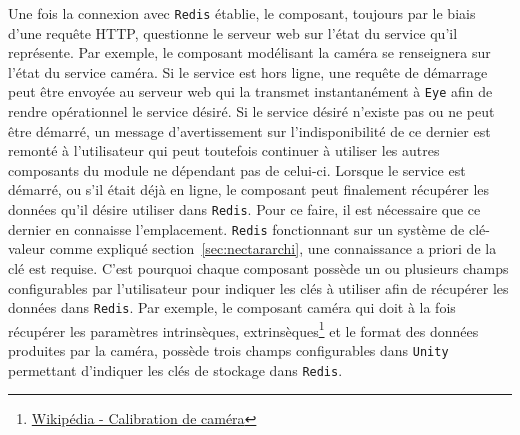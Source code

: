 Une fois la connexion avec \texttt{Redis} établie, le composant, toujours par le biais d'une requête HTTP, questionne le serveur web sur l'état du service qu'il représente. Par exemple, le composant modélisant la caméra se renseignera sur l'état du service caméra. Si le service est hors ligne, une requête de démarrage peut être envoyée au serveur web qui la transmet instantanément à \texttt{Eye} afin de rendre opérationnel le service désiré. Si le service désiré n'existe pas ou ne peut être démarré, un message d'avertissement sur l'indisponibilité de ce dernier est remonté à l'utilisateur qui peut toutefois continuer à utiliser les autres composants du module ne dépendant pas de celui-ci. 
Lorsque le service est démarré, ou s'il était déjà en ligne, le composant peut finalement récupérer les données qu'il désire utiliser dans \texttt{Redis}. Pour ce faire, il est nécessaire que ce dernier en connaisse l'emplacement. \texttt{Redis} fonctionnant sur un système de clé-valeur comme expliqué section~\ref{sec:nectararchi}, une connaissance a priori de la clé est requise. C'est pourquoi chaque composant possède un ou plusieurs champs configurables par l'utilisateur pour indiquer les clés à utiliser afin de récupérer les données dans \texttt{Redis}. Par exemple, le composant caméra qui doit à la fois récupérer les paramètres intrinsèques, extrinsèques\footnote{\href{https://fr.wikipedia.org/wiki/Calibration_de_caméra}{Wikipédia - Calibration de caméra}} et le format des données produites par la caméra, possède trois champs configurables dans \texttt{Unity} permettant d'indiquer les clés de stockage dans \texttt{Redis}.\\

